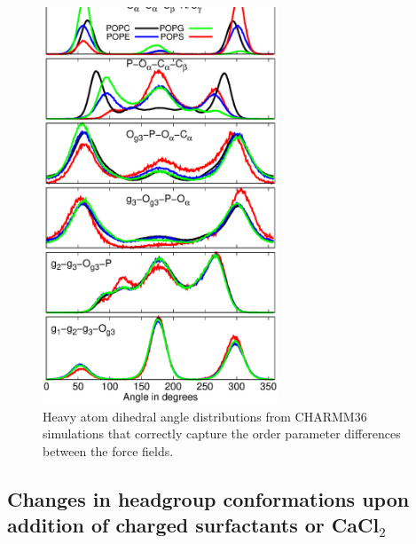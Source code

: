 \documentclass[journal=jpcbfk]{achemso}
\begin{document}
\begin{figure}[]
  \centering
  \includegraphics[width=7.0cm]{./Figs/DIHEDRALS.eps}
  \caption{\label{DIHdists}
    Heavy atom dihedral angle distributions from CHARMM36 simulations that correctly capture the
    order parameter differences between the force fields.
  }
\end{figure}




\clearpage
\subsection{Changes in headgroup conformations upon addition of charged surfactants or CaCl$_2$}
\end{document}
